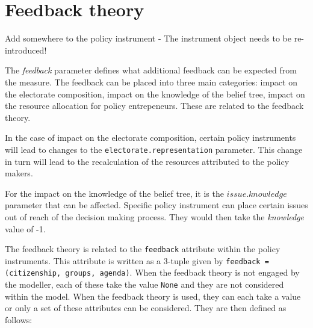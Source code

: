 





\section{Feedback theory}


Add somewhere to the policy instrument - The instrument object needs to be re-introduced!


The \emph{feedback} parameter defines what additional feedback can be expected from the measure. The feedback can be placed into three main categories: impact on the electorate composition, impact on the knowledge of the belief tree, impact on the resource allocation for policy entrepeneurs. These are related to the feedback theory.




In the case of impact on the electorate composition, certain policy instruments will lead to changes to the \texttt{electorate.representation} parameter. This change in turn will lead to the recalculation of the resources attributed to the policy makers.




For the impact on the knowledge of the belief tree, it is the $issue.knowledge$ parameter that can be affected. Specific policy instrument can place certain issues out of reach of the decision making process. They would then take the \emph{knowledge} value of -1.








The feedback theory is related to the \texttt{feedback} attribute within the policy instruments. This attribute is written as a 3-tuple given by \texttt{feedback = (citizenship, groups, agenda)}. When the feedback theory is not engaged by the modeller, each of these take the value \texttt{None} and they are not considered within the model. When the feedback theory is used, they can each take a value or only a set of these attributes can be considered. They are then defined as follows:


